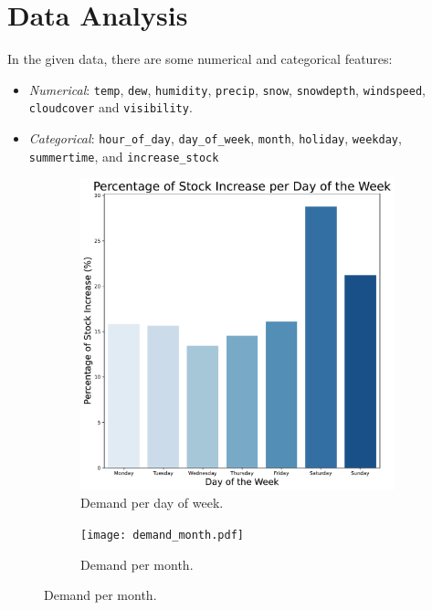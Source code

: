 \section{Data Analysis}
In the given data, there are some numerical and categorical features:
\begin{itemize}
    \item \emph{Numerical}: \texttt{temp}, \texttt{dew}, \texttt{humidity}, \texttt{precip}, \texttt{snow}, \texttt{snowdepth}, \texttt{windspeed}, \texttt{cloudcover} and \texttt{visibility}.
    \item \emph{Categorical}: \texttt{hour\_of\_day}, \texttt{day\_of\_week}, \texttt{month}, \texttt{holiday}, \texttt{weekday}, \texttt{summertime}, and \texttt{increase\_stock}
\end{itemize}

\begin{figure}[htbp]
    \centering
    \begin{subfigure}{0.3\textwidth}
        \centering
        \includegraphics[width=\textwidth]{demand_day.pdf}
        \caption{Demand per day of week.}
        \label{fig:demand day}
    \end{subfigure}
    \hfill
    \begin{subfigure}{0.3\textwidth}
        \centering
        \texttt{[image: demand\_month.pdf]}
        \caption{Demand per month.}

\end{subfigure}
\end{figure}
